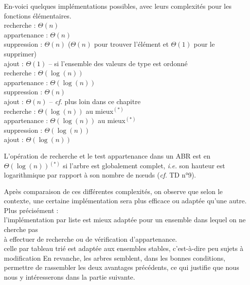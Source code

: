 			En-voici quelques implémentations possibles, avec leurs complexités pour les fonctions élémentaires. \nt
				 \\
					 \bdot recherche : \(\Theta(n)\) \\
					 \bdot appartenance : \(\Theta(n)\) \\
					 \bdot suppression : \(\Theta(n)\) (\(\Theta(n)\) pour trouver l'élément et \(\Theta(1)\) pour le supprimer) \\
					 \bdot ajout : \(\Theta(1)\) \nt
				 -- si l'ensemble des valeurs de type  est ordonné \\
					 \bdot recherche : \(\Theta(\log(n))\) \\
					 \bdot appartenance : \(\Theta(\log(n))\) \\
					 \bdot suppression : \(\Theta(n)\) \\
					 \bdot ajout : \(\Theta(n)\) \nt
				 -- \emph{cf.} plus loin dans ce chapitre \\
					 \bdot recherche : \(\Theta(\log(n))\) au mieux$^{(*)}$ \\
					 \bdot appartenance : \(\Theta(\log(n))\) au mieux$^{(*)}$ \\
					 \bdot suppression : \(\Theta(\log(n))\) \\
					 \bdot ajout : \(\Theta(\log(n))\)
			
			\begin{Remarque}
				L'opération de recherche et le test appartenance dans un ABR est en \(\Theta(\log(n))\)$^{(*)}$ si l'arbre est globalement complet, \emph{i.e.} son hauteur est logarithmique par rapport à son nombre de n\oe uds (\emph{cf.} TD n°9).
			\end{Remarque}
			
			Après comparaison de ces différentes complexités, on observe que selon le contexte, une certaine implémentation sera plus efficace ou adaptée qu'une autre. Plus précisément : \\
				 \bdot l'implémentation par liste est mieux adaptée pour un ensemble dans lequel on ne cherche pas \\  \listspace à effectuer de recherche ou de vérification d'appartenance. \\
				 \bdot celle par tableau trié est adaptée aux ensembles stables, c'est-à-dire peu sujets à modification \nt
			En revanche, les arbres semblent, dans les bonnes conditions, permettre de rassembler les deux avantages précédents, ce qui justifie que nous nous y intéresserons dans la partie suivante.
			
